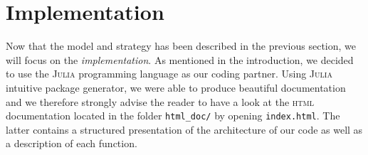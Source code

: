 \section{Implementation} %
\label{sec:implementation}
Now that the model and strategy has been described in the previous
section, we will focus on the \emph{implementation}.
As mentioned in the introduction, we decided to use the \textsc{Julia}
programming language as our coding partner.
Using \textsc{Julia} intuitive package generator, we were able to
produce beautiful documentation and we therefore strongly advise
the reader to have a look at the \textsc{html} documentation located
in the folder \lstinline|html_doc/| by opening \texttt{index.html}.
The latter contains a structured presentation of the architecture
of our code as well as a description of each function.




